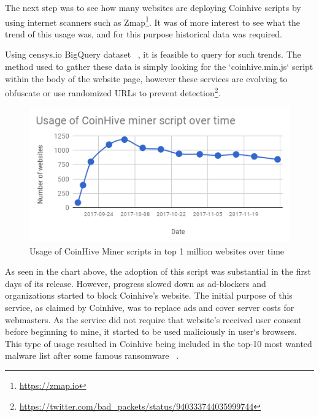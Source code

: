 The next step was to see how many websites are deploying Coinhive scripts by using internet scanners such as Zmap\footnote{\url{https://zmap.io}}. It was of more interest to see what the trend of this usage was, and for this purpose historical data was required. 


Using censys.io BigQuery dataset ~\cite{censys15}, it is feasible to query for such trends. The method used to gather these data is simply looking for the `coinhive.min.js` script within the body of the website page, however these services are evolving to obfuscate or use randomized URLs to prevent detection\footnote{\url{https://twitter.com/bad_packets/status/940333744035999744}}.

\begin{figure}[t]
\centering
\includegraphics[width=\linewidth]{figures/usage_of_coinhive_over_time.png}
\caption{Usage of CoinHive Miner scripts in top 1 million websites over time}
\end{figure}


As seen in the chart above, the adoption of this script was substantial in the first days of its release. However, progress slowed down as ad-blockers and organizations started to block Coinhive's website. The initial purpose of this service, as claimed by Coinhive, was to replace ads and cover server costs for webmasters. As the service did not require that website's received user consent before beginning to mine, it started to be used maliciously in user`s browsers. This type of usage resulted in Coinhive being included in the top-10 most wanted malware list after some famous ransomware ~\cite{checkpoint}. 

